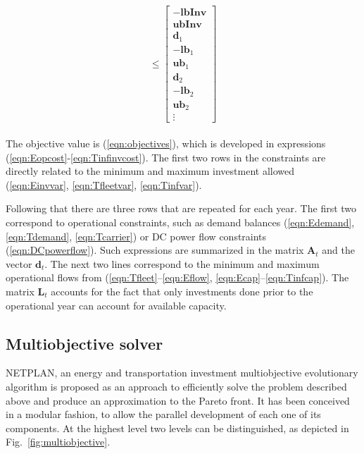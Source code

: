 \documentclass{article}
\begin{document}
\begin{align}
\begin{split}
 \le
 \begin{bmatrix} -\textbf{lbInv} \\ \textbf{ubInv} \\ \textbf{d}_1 \\ -\textbf{lb}_1 \\ \textbf{ub}_1 \\ \textbf{d}_2 \\ -\textbf{lb}_2 \\ \textbf{ub}_2 \\ \vdots \end{bmatrix}
\end{split} \label{eqn:matrixform}
\end{align}

The objective value is (\ref{eqn:objectives}), which is developed in expressions (\ref{eqn:Eopcost}-\ref{eqn:Tinfinvcost}). The first two rows in the constraints are directly related to the minimum and maximum investment allowed (\ref{eqn:Einvvar}, \ref{eqn:Tfleetvar}, \ref{eqn:Tinfvar}).

Following that there are three rows that are repeated for each year. The first two correspond to operational constraints, such as demand balances (\ref{eqn:Edemand}, \ref{eqn:Tdemand}, \ref{eqn:Tcarrier}) or DC power flow constraints (\ref{eqn:DCpowerflow}). Such expressions are summarized in the matrix $\textbf{A}_t$ and the vector $\textbf{d}_t$. The next two lines correspond to the minimum and maximum operational flows from (\ref{eqn:Tfleet}--\ref{eqn:Eflow}, \ref{eqn:Ecap}--\ref{eqn:Tinfcap}). The matrix $\textbf{L}_t$ accounts for the fact that only investments done prior to the operational year can account for available capacity.


\subsection{Multiobjective solver} \label{sec:multiobjective}

NETPLAN, an energy and transportation investment multiobjective evolutionary algorithm is proposed as an approach to efficiently solve the problem described above and produce an approximation to the Pareto front. It has been conceived in a modular fashion, to allow the parallel development of each one of its components. At the highest level two levels can be distinguished, as depicted in Fig.~\ref{fig:multiobjective}.
\end{document}
